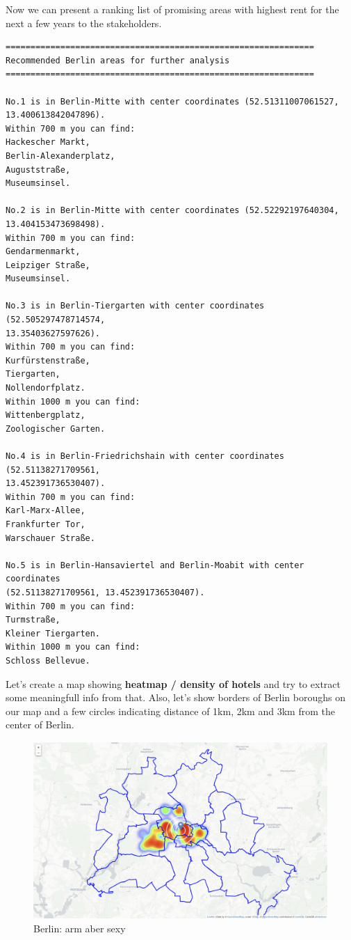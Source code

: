 \documentclass[11pt]{article}
\begin{document}
        
    Now we can present a ranking list of promising areas with highest rent
for the next a few years to the stakeholders.

    

    \begin{Verbatim}[commandchars=\\\{\}]
==============================================================
Recommended Berlin areas for further analysis
==============================================================

No.1 is in Berlin-Mitte with center coordinates (52.51311007061527,
13.400613842047896).
Within 700 m you can find:
Hackescher Markt,
Berlin-Alexanderplatz,
Auguststraße,
Museumsinsel.

No.2 is in Berlin-Mitte with center coordinates (52.52292197640304,
13.404153473698498).
Within 700 m you can find:
Gendarmenmarkt,
Leipziger Straße,
Museumsinsel.

No.3 is in Berlin-Tiergarten with center coordinates (52.505297478714574,
13.35403627597626).
Within 700 m you can find:
Kurfürstenstraße,
Tiergarten,
Nollendorfplatz.
Within 1000 m you can find:
Wittenbergplatz,
Zoologischer Garten.

No.4 is in Berlin-Friedrichshain with center coordinates (52.51138271709561,
13.452391736530407).
Within 700 m you can find:
Karl-Marx-Allee,
Frankfurter Tor,
Warschauer Straße.

No.5 is in Berlin-Hansaviertel and Berlin-Moabit with center coordinates
(52.51138271709561, 13.452391736530407).
Within 700 m you can find:
Turmstraße,
Kleiner Tiergarten.
Within 1000 m you can find:
Schloss Bellevue.

    \end{Verbatim}

    Let's create a map showing \textbf{heatmap / density of hotels} and try
to extract some meaningfull info from that. Also, let's show borders of
Berlin boroughs on our map and a few circles indicating distance of 1km,
2km and 3km from the center of Berlin.

     \begin{figure}
\centering
\includegraphics[scale=1]{"Screenshot (26).png"}
\caption{Berlin: arm aber sexy}
\end{figure}
\end{document}
